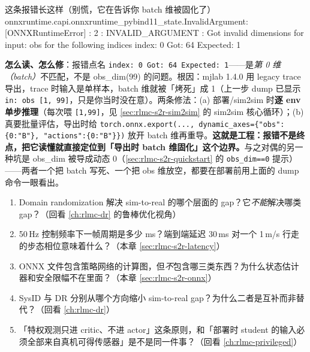 \begin{codebox}[text]{这条报错长这样（别慌，它在告诉你 batch 维被固化了）}
onnxruntime.capi.onnxruntime_pybind11_state.InvalidArgument:
  [ONNXRuntimeError] : 2 : INVALID_ARGUMENT :
  Got invalid dimensions for input: obs for the following indices
  index: 0 Got: 64 Expected: 1
\end{codebox}

\noindent{}\textbf{怎么读、怎么修}：报错点名 \verb|index: 0 Got: 64 Expected: 1|——是\emph{第 0 维（batch）}不匹配，不是 obs\_dim(99) 的问题。根因：mjlab 1.4.0 用 legacy trace 导出，trace 时输入是单样本，batch 维就被「烤死」成 1（上一步 dump 已显示 \verb|in: obs [1, 99]|，只是你当时没在意）。两条修法：(a) 部署/sim2sim 时\textbf{逐 env 单步推理}（每次喂 \verb|[1,99]|，见 \cref{sec:rlmc-s2r-sim2sim} 的 sim2sim 核心循环）；(b) 真要批量评估，导出时给 \verb|torch.onnx.export(..., dynamic_axes={"obs":{0:"B"}, "actions":{0:"B"}})| 放开 batch 维再重导。\textbf{这就是工程：报错不是终点，把它读懂就直接定位到「导出时 batch 维固化」这个边界。}与之对偶的另一种坑是 obs\_dim 被导成动态 0（\cref{sec:rlmc-s2r-quickstart} 的 \verb|obs_dim==0| 提示）——两者一个把 batch 写死、一个把 obs 维放空，都要在部署前用上面的 dump 命令一眼看出。

\begin{practice}
\begin{enumerate}
  \item Domain randomization 解决 sim-to-real 的哪个层面的 gap？它\emph{不能}解决哪类 gap？（回看 \cref{ch:rlmc-dr} 的鲁棒优化视角）
  \item 50\,Hz 控制频率下一帧周期是多少 ms？端到端延迟 30\,ms 对一个 1\,m/s 行走的步态相位意味着什么？（本章 \cref{sec:rlmc-s2r-latency}）
  \item ONNX 文件包含策略网络的计算图，但\emph{不}包含哪三类东西？为什么状态估计器和安全限幅不在里面？（本章 \cref{sec:rlmc-s2r-onnx}）
  \item SysID 与 DR 分别从哪个方向缩小 sim-to-real gap？为什么二者是互补而非替代？（回看 \cref{ch:rlmc-dr}）
  \item 「特权观测只进 critic、不进 actor」这条原则，和「部署时 student 的输入必须全部来自真机可得传感器」是不是同一件事？（回看 \cref{ch:rlmc-privileged}）
\end{enumerate}
\end{practice}

